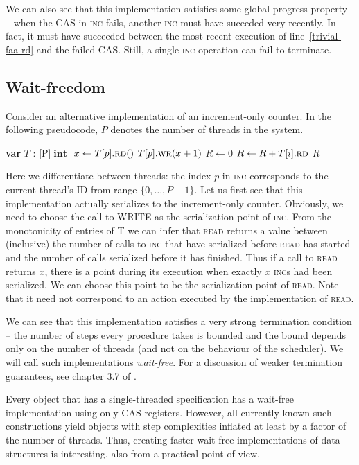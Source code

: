 \documentclass[a4paper,11pt]{article}
\def\int{\ensuremath{\operatorname{\textbf{int}}}}
\newcommand{\fn}[1]{\textsc{#1}}
\newcommand{\var}[2]{\textbf{var }#1 : #2}
\newcommand{\arrayspec}[1]{\text{array}[#1]\text{ of }}
\begin{document}
We can also see that this implementation satisfies some global progress property -- when the CAS in \fn{inc} fails,
another \fn{inc} must have suceeded very recently. In fact, it must have succeeded between the most recent execution
of line~\ref{trivial-faa-rd} and the failed CAS. Still, a single \fn{inc} operation can fail to terminate.

\subsection{Wait-freedom}

Consider an alternative implementation of an increment-only counter. In the following pseudocode, $P$ denotes
the number of threads in the system.

\begin{algorithmic}[1]
	\State\var{$T$}{\arrayspec{P}$\int$} \Comment{T is an array of $P$ CAS objects of type \int}
	\State $x \gets T[p].\fn{rd}()$
	\State $T[p].\fn{wr}(x + 1)$
\EndFunction
{}
	\State $R \gets 0$
	\State $R \gets R + T[i].\fn{rd}$
	\EndFor
	\State\Return $R$
\EndFunction
\end{algorithmic}

Here we differentiate between threads: the index $p$ in \fn{inc} corresponds to the current thread's ID from range
$\{0, \ldots, P-1\}$. Let us first see that this implementation actually serializes to the increment-only counter.
Obviously, we need to choose the call to WRITE as the serialization point of \fn{inc}. From the monotonicity
of entries of T we can infer that \fn{read} returns a value between (inclusive) the number of calls to \fn{inc} that have
serialized before \fn{read} has started and the number of calls serialized before it has finished.
Thus if a call to \fn{read} returns $x$, there is a point during its
execution when exactly $x$ \fn{inc}s had been serialized. We can choose this point to be the serialization point of
\fn{read}. Note that it need not correspond to an action executed by the implementation of \fn{read}.

We can see that this implementation satisfies a very strong termination condition -- the number of steps every
procedure takes is bounded and the bound depends only on the number of threads (and not on the behaviour of
the scheduler). We will call such implementations \emph{wait-free}. For a discussion of weaker
termination guarantees, see chapter 3.7 of \cite{TheArt}.

Every object that has a single-threaded specification has a wait-free implementation\cite{cas-univ} using
only CAS registers.
However, all currently-known such constructions yield objects with step complexities inflated at least by a factor
of the number of threads.
Thus, creating faster wait-free implementations of data structures is interesting, also from a practical
point of view.
\end{document}
